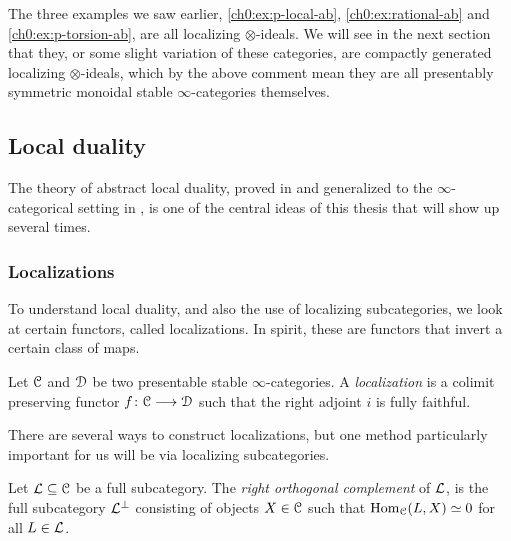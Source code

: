 \begin{example}
    The three examples we saw earlier, \cref{ch0:ex:p-local-ab}, \cref{ch0:ex:rational-ab} and \cref{ch0:ex:p-torsion-ab}, are all localizing $\otimes$-ideals. We will see in the next section that they, or some slight variation of these categories, are compactly generated localizing $\otimes$-ideals, which by the above comment mean they are all presentably symmetric monoidal stable $\infty$-categories themselves. 
\end{example}





\subsection{Local duality}
\label{ch0:ssec:local-duality}

The theory of abstract local duality, proved in \cite{hovey-palmiery-strickland_97} and generalized to the $\infty$-categorical setting in \cite{barthel-heard-valenzuela_2018}, is one of the central ideas of this thesis that will show up several times. 

\subsubsection{Localizations}

To understand local duality, and also the use of localizing subcategories, we look at certain functors, called localizations. In spirit, these are functors that invert a certain class of maps. 

\begin{definition}
    \label{ch0:def:localization}
    Let $\EuScript{C}$ and $\EuScript{D}$ be two presentable stable $\infty$-categories. A \emph{localization} is a colimit preserving functor $f\colon \EuScript{C}\longrightarrow \EuScript{D}$ such that the right adjoint $i$ is fully faithful.  
\end{definition}

There are several ways to construct localizations, but one method particularly important for us will be via localizing subcategories. 

\begin{definition}
    \label{ch0:def:right-orthogonal-complement}
    Let $\mathcal{L}\subseteq \EuScript{C}$ be a full subcategory. The \emph{right orthogonal complement} of $\mathcal{L}$, is the full subcategory $\mathcal{L}^\perp$ consisting of objects $X\in \EuScript{C}$ such that $\operatorname{Hom}_{\EuScript{C}}(L,X)\simeq 0$ for all $L\in \mathcal{L}$.  
\end{definition}

